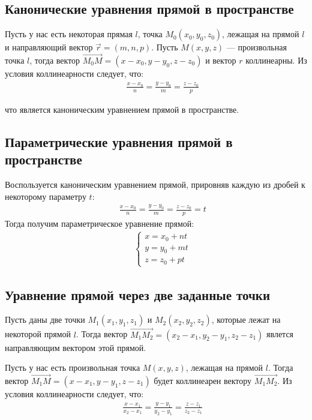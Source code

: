 \documentclass[12pt, fleqn]{extarticle}
\begin{document}
\subsection*{Канонические уравнения прямой в пространстве}
Пусть у нас есть некоторая прямая \(l\), точка \(M_0(x_0, y_0, z_0)\), лежащая на прямой \(l\) и направляющий вектор \(\overrightarrow{r} = (m, n, p)\). Пусть \(M(x, y, z)\) — произвольная точка \(l\), тогда вектор \(\overrightarrow{M_0M} = (x - x_0, y - y_0, z - z_0)\) и вектор \(r\) коллинеарны. Из условия коллинеарности следует, что:
\begin{align*}
     &  &
    \frac{x - x_0}{n} = \frac{y - y_0}{m} = \frac{z - z_0}{p}
\end{align*}

что является каноническим уравнением прямой в пространстве.

\subsection*{Параметрические уравнения прямой в пространстве}
Воспользуется каноническим уравнением прямой, прировняв каждую из дробей к некоторому параметру \(t\):
\begin{align*}
     &  &
    \frac{x - x_0}{n} = \frac{y - y_0}{m} = \frac{z - z_0}{p} = t
\end{align*}
Тогда получим параметрическое уравнение прямой:
\begin{align*}
     &  &
    \begin{cases}
        x = x_0 + nt \\
        y = y_0 + mt \\
        z = z_0 + pt
    \end{cases}
\end{align*}

\subsection*{Уравнение прямой через две заданные точки}
Пусть даны две точки \(M_1(x_1, y_1, z_1)\) и \(M_2(x_2, y_2, z_2)\), которые лежат на некоторой прямой \(l\). Тогда вектор  \(\overrightarrow{M_1M_2} = (x_2 - x_1, y_2 - y_1, z_2 - z_1)\) явлется направляющим вектором этой прямой.

Пусть у нас есть произвольная точка \(M(x, y, z)\), лежащая на прямой \(l\). Тогда вектор \(\overrightarrow{M_1M} = (x - x_1, y - y_1, z - z_1)\) будет коллинеарен вектору \(\overrightarrow{M_1M_2}\). Из условия коллинеарности следует, что:
\begin{align*}
     &  &
    \frac{x - x_1}{x_2 - x_1} = \frac{y - y_1}{y_2 - y_1} = \frac{z - z_1}{z_2 - z_1}
\end{align*}
\end{document}
